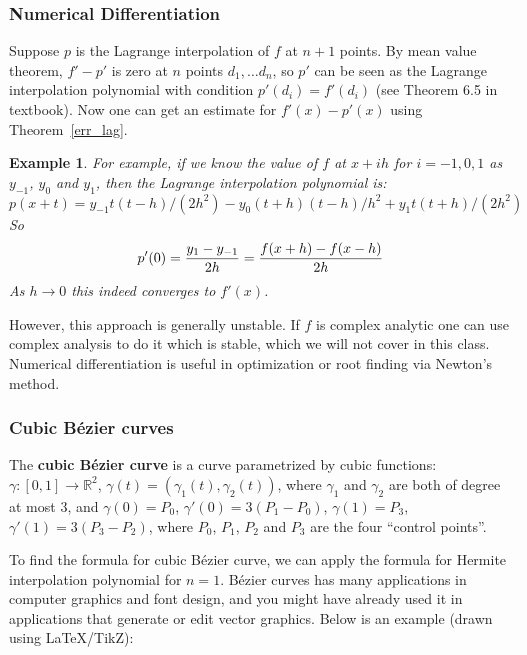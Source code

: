 \documentclass[20pt]{article} %
\theoremstyle{break}
\newtheorem{exa}[definition]{Example}
\begin{document}
\subsubsection{Numerical Differentiation}
Suppose $p$ is the Lagrange interpolation of $f$ at $n+1$ points. By mean value theorem, $f'-p'$ is zero at $n$ points $d_1, \dots d_n$, so $p'$ can be seen as the Lagrange interpolation polynomial with condition $p'(d_i)=f'(d_i)$ (see Theorem 6.5 in textbook). Now one can get an estimate for $f'(x)-p'(x)$ using Theorem~\ref{err_lag}.\\

\begin{exa}
  For example, if we know the value of $f$ at $x+ih$ for $i=-1, 0, 1$ as $y_{-1}$, $y_0$ and $y_1$, then the Lagrange interpolation polynomial is:
  \[p(x+t)=y_{-1}t(t-h)/(2h^2)-y_0(t+h)(t-h)/h^2+y_1t(t+h)/(2h^2)\]
  So
  \[p'(0)={y_1-y_{-1}\over 2h}={f(x+h)-f(x-h)\over 2h}\]
  As $h\rightarrow 0$ this indeed converges to $f'(x)$.
 \end{exa}

However, this approach is generally unstable. If $f$ is complex analytic one can use complex analysis to do it which is stable, which we will not cover in this class.\\

Numerical differentiation is useful in optimization or root finding via Newton's method.

\newpage

\subsubsection{Cubic B{\'e}zier curves}
The {\bf cubic B{\'e}zier curve} is a curve parametrized by cubic functions: $\gamma: [0, 1]\rightarrow \mathbb{R}^2$, $\gamma(t)=(\gamma_1(t), \gamma_2(t))$, where $\gamma_1$ and $\gamma_2$ are both of degree at most $3$, and $\gamma(0)=P_0$, $\gamma'(0)=3(P_1-P_0)$, $\gamma(1)=P_3$, $\gamma'(1)=3(P_3-P_2)$, where $P_0$, $P_1$, $P_2$ and $P_3$ are the four ``control points''.

To find the formula for cubic B{\'e}zier curve, we can apply the formula for Hermite interpolation polynomial for $n=1$. B{\'e}zier curves has many applications in computer graphics and font design, and you might have already used it in applications that generate or edit vector graphics. Below is an example (drawn using LaTeX/TikZ):
\begin{figure}[H]
\end{figure}
\newpage
\end{document}
